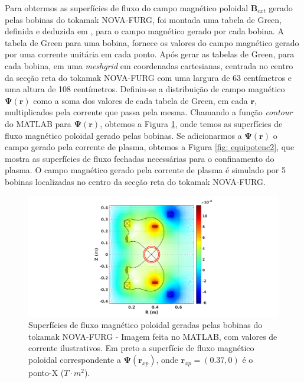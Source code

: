 \documentclass[12pt,oneside,a4paper]{abntex2}
\begin{document}
Para obtermos as superfícies de fluxo do campo magnético poloidal $\bm{B}_{ext}$ gerado pelas bobinas do tokamak NOVA-FURG, foi montada uma tabela de Green, definida e deduzida em \cite[pg. 154]{MagneticControl}, para o campo magnético gerado por cada bobina. 
A tabela de Green para uma bobina, fornece os valores do campo magnético gerado por uma corrente unitária em cada ponto. 
Após gerar as tabelas de Green, para cada bobina, em uma \textit{meshgrid} em coordenadas cartesianas, centrada no centro da secção reta do tokamak NOVA-FURG com uma largura de 63 centímetros e uma altura de 108 centímetros.
Definiu-se a distribuição de campo magnético $\bm{\Psi}(\bm{r})$ como a soma dos valores de cada tabela de Green, em cada $\bm{r}$, multiplicados pela corrente que passa pela mesma.
Chamando a função \textit{contour} do MATLAB para $\bm{\Psi}(\bm{r})$, obtemos a Figura \ref{fig: equipotenc}, onde temos as superfícies de fluxo magnético poloidal gerado pelas bobinas. 
Se adicionarmos a $\bm{\Psi}(\bm{r})$ o campo gerado pela corrente de plasma, obtemos a Figura \ref{fig: equipotenc2}, que mostra as superfícies de fluxo fechadas necessárias para o confinamento do plasma. 
O campo magnético gerado pela corrente de plasma é simulado por 5 bobinas localizadas no centro da secção reta do tokamak NOVA-FURG.
\begin{figure}[H]
\centering
\includegraphics[scale=0.5]{campo001-2.png} 
\caption{Superfícies de fluxo magnético poloidal geradas pelas bobinas do tokamak NOVA-FURG - Imagem feita no MATLAB, com valores de corrente ilustrativos.  Em preto a superfície de fluxo magnético poloidal correspondente a $\bm{\Psi}(\bm{r}_{xp})$, onde $\bm{r}_{xp}=(0.37,0)$ é o ponto-X ($T \cdot m^2$).}
\label{fig: equipotenc}
\end{figure}
\end{document}
